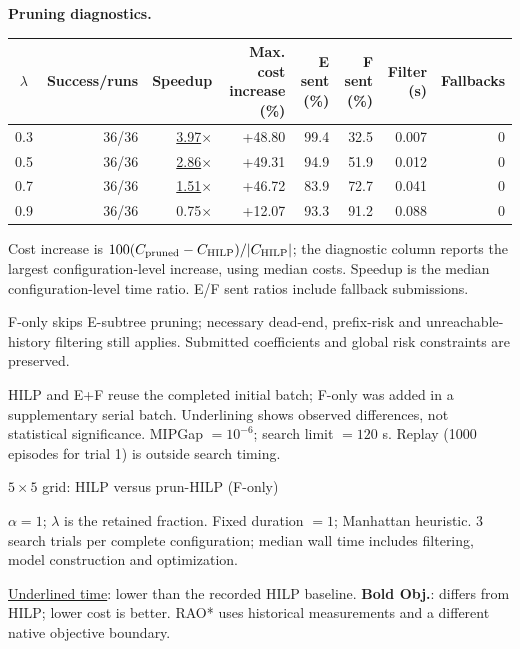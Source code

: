 \documentclass[10pt]{article}
\begin{document}
\medskip\noindent\textbf{Pruning diagnostics.}\par
\begin{center}\small\begin{tabular}{crrrrrrr}\toprule
$\lambda$ & Success/runs & Speedup & Max. cost increase (\%) & E sent (\%) & F sent (\%) & Filter (s) & Fallbacks \\ \midrule
0.3 & 36/36 & \underline{3.97$\times$} & +48.80 & 99.4 & 32.5 & 0.007 & 0 \\
0.5 & 36/36 & \underline{2.86$\times$} & +49.31 & 94.9 & 51.9 & 0.012 & 0 \\
0.7 & 36/36 & \underline{1.51$\times$} & +46.72 & 83.9 & 72.7 & 0.041 & 0 \\
0.9 & 36/36 & 0.75$\times$ & +12.07 & 93.3 & 91.2 & 0.088 & 0 \\
\bottomrule\end{tabular}\end{center}
\noindent\small Cost increase is $100(C_{\rm pruned}-C_{\rm HILP})/|C_{\rm HILP}|$; the diagnostic column reports the largest configuration-level increase, using median costs. Speedup is the median configuration-level time ratio. E/F sent ratios include fallback submissions.\par
\noindent\small F-only skips E-subtree pruning; necessary dead-end, prefix-risk and unreachable-history filtering still applies. Submitted coefficients and global risk constraints are preserved.\par
\noindent\small HILP and E+F reuse the completed initial batch; F-only was added in a supplementary serial batch. Underlining shows observed differences, not statistical significance. MIPGap $=10^{-6}$; search limit $=120$ s. Replay (1000 episodes for trial 1) is outside search timing.\par
\clearpage
\begin{center}\Large $ 5\times5$ grid: HILP versus prun-HILP (F-only)\end{center}
\noindent $\alpha=1$; $\lambda$ is the retained fraction. Fixed duration $=1$; Manhattan heuristic. 3 search trials per complete configuration; median wall time includes filtering, model construction and optimization.\par
\noindent \underline{Underlined time}: lower than the recorded HILP baseline. \textbf{Bold Obj.}: differs from HILP; lower cost is better. RAO* uses historical measurements and a different native objective boundary.\par
\end{document}
